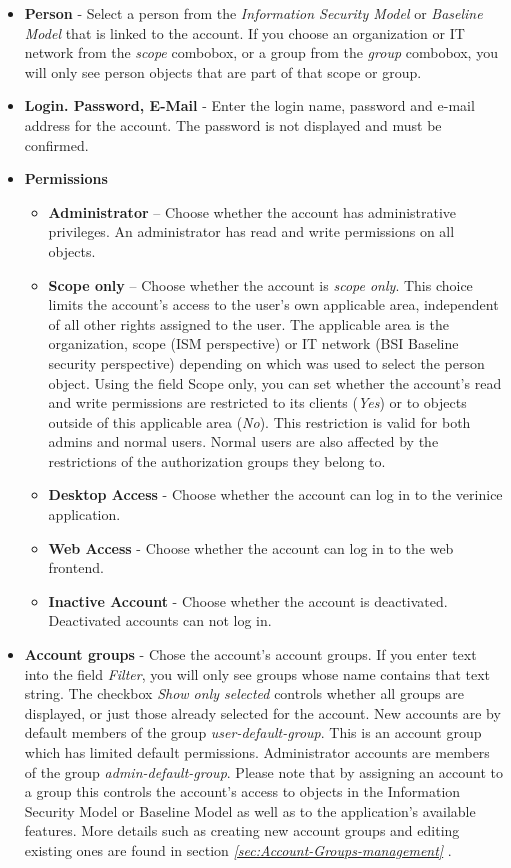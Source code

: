 \documentclass[a4paper,10pt]{book}
\begin{document}
\begin{itemize}
\item \textbf{Person} - Select a person from the \textit{Information Security Model} or \textit{Baseline Model} that is linked to the account. If you choose an organization or IT network from the \textit{scope} combobox, or a group from the \textit{group} combobox, you will only see person objects that are part of that scope or group.
\item \textbf{Login. Password, E-Mail} - Enter the login name, password and e-mail address for the account. The password is not displayed and must be confirmed.
\item \textbf{Permissions} \begin{itemize}
\item \textbf{Administrator} – Choose whether the account has administrative privileges. An administrator has read and write permissions on all objects.
\item \textbf{Scope only} – Choose whether the account is \textit{scope only}. This choice limits the account’s access to the user’s own applicable area, independent of all other rights assigned to the user. The applicable area is the organization, scope (ISM perspective) or IT network (BSI Baseline security perspective) depending on which was used to select the person object. Using the field Scope only, you can set whether the account’s read and write permissions are restricted to its clients (\textit{Yes}) or to objects outside of this applicable area (\textit{No}). This restriction is valid for both admins and normal users. Normal users are also affected by the restrictions of the authorization groups they belong to.
\item \textbf{Desktop Access} - Choose whether the account can log in to the verinice application.
\item \textbf{Web Access} - Choose whether the account can log in to the web frontend.
\item \textbf{Inactive Account} - Choose whether the account is deactivated. Deactivated accounts can not log in.
\end{itemize}
\item \textbf{Account groups} - Chose the account’s account groups. If you enter text into the field \textit{Filter}, you will only see groups whose name contains that text string. The checkbox \textit{Show only selected} controls whether all groups are displayed, or just those already selected for the account. New accounts are by default members of the group \textit{user-default-group}. This is an account group which has limited default permissions. Administrator accounts are members of the group \textit{admin-default-group}. Please note that by assigning an account to a group this controls the account’s access to objects in the Information Security Model or Baseline Model as well as to the application’s available features. More details such as creating new account groups and editing existing ones are found in section {\em \ref{sec:Account-Groups-management} }.

\end{itemize}
\end{document}
